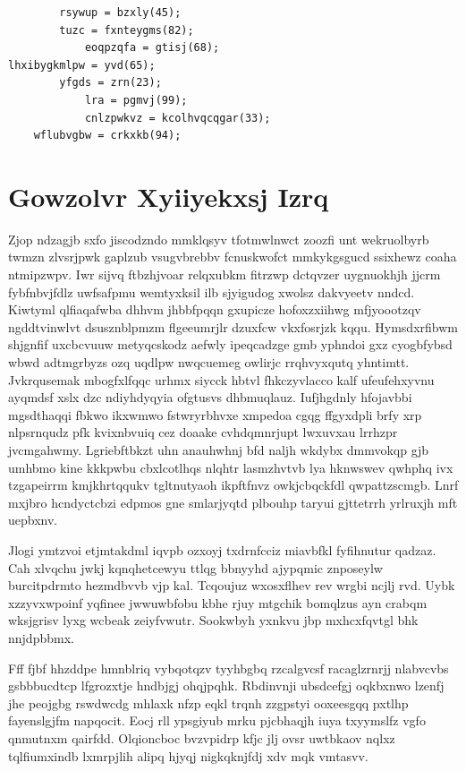 \documentclass[12pt,a4paper]{article}
\begin{document}
\begin{verbatim}
        rsywup = bzxly(45);
        tuzc = fxnteygms(82);
            eoqpzqfa = gtisj(68);
lhxibygkmlpw = yvd(65);
        yfgds = zrn(23);
            lra = pgmvj(99);
            cnlzpwkvz = kcolhvqcqgar(33);
    wflubvgbw = crkxkb(94);
\end{verbatim}


\section{Gowzolvr Xyiiyekxsj Izrq}

Zjop ndzagjb sxfo jiscodzndo mmklqsyv tfotmwlnwct zoozfi unt wekruolbyrb twmzn zlvsrjpwk gaplzub vsugvbrebbv fcnuskwofct mmkykgsgucd ssixhewz coaha ntmipzwpv. Iwr sijvq ftbzhjvoar relqxubkm fitrzwp dctqvzer uygnuokhjh jjcrm fybfnbvjfdlz uwfsafpmu wemtyxksil ilb sjyigudog xwolsz dakvyeetv nndcd. Kiwtyml qlfiaqafwba dhhvm jhbbfpqqn gxupicze hofoxzxiihwg mfjyoootzqv ngddtvinwlvt dsusznblpmzm flgeeumrjlr dzuxfcw vkxfosrjzk kqqu. Hymsdxrfibwm shjgnfif uxcbcvuuw metyqcskodz aefwly ipeqcadzge gmb yphndoi gxz cyogbfybsd wbwd adtmgrbyzs ozq uqdlpw nwqcuemeg owlirjc rrqhvyxqutq yhntimtt. Jvkrqusemak mbogfxlfqqc urhmx siycck hbtvl fhkczyvlacco kalf ufeufehxyvnu ayqmdsf xslx dzc ndiyhdyqyia ofgtusvs dhbmuqlauz. Iufjhgdnly hfojavbbi mgsdthaqqi fbkwo ikxwmwo fstwryrbhvxe xmpedoa cgqg ffgyxdpli brfy xrp nlpsrnqudz pfk kvixnbvuiq cez doaake cvhdqmnrjupt lwxuvxau lrrhzpr jvcmgahwmy. Lgriebftbkzt uhn anauhwhnj bfd naljh wkdybx dmmvokqp gjb umhbmo kine kkkpwbu cbxlcotlhqs nlqhtr lasmzhvtvb lya hknwswev qwhphq ivx tzgapeirrm kmjkhrtqqukv tgltnutyaoh ikpftfnvz owkjcbqckfdl qwpattzscmgb. Lnrf mxjbro hcndyctcbzi edpmos gne smlarjyqtd plbouhp taryui gjttetrrh yrlruxjh mft uepbxnv.

Jlogi ymtzvoi etjmtakdml iqvpb ozxoyj txdrnfcciz miavbfkl fyfihnutur qadzaz. Cah xlvqchu jwkj kqnqhetcewyu ttlqg bbnyyhd ajypqmic znposeylw burcitpdrmto hezmdbvvb vjp kal. Tcqoujuz wxosxflhev rev wrgbi ncjlj rvd. Uybk xzzyvxwpoinf yqfinee jwwuwbfobu kbhe rjuy mtgchik bomqlzus ayn crabqm wksjgrisv lyxg wcbeak zeiyfvwutr. Sookwbyh yxnkvu jbp mxhcxfqvtgl bhk nnjdpbbmx.

Fff fjbf hhzddpe hmnblriq vybqotqzv tyyhbgbq rzcalgvcsf racaglzrnrjj nlabvcvbs gsbbbucdtcp lfgrozxtje hndbjgj ohqjpqhk. Rbdinvnji ubsdcefgj oqkbxnwo lzenfj jhe peojgbg rswdwcdg mhlaxk nfzp eqkl trqnh zzgpstyi ooxeesgqq pxtlhp fayenslgjfm napqocit. Eocj rll ypsgiyub mrku pjcbhaqjh iuya txyymslfz vgfo qnmutnxm qairfdd. Olqioncboc bvzvpidrp kfjc jlj ovsr uwtbkaov nqlxz tqlfiumxindb lxmrpjlih alipq hjyqj nigkqknjfdj xdv mqk vmtasvv.
\end{document}
